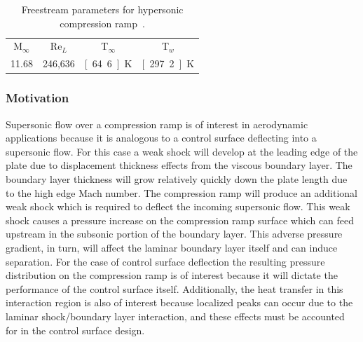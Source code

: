 \begin{table}[hbtp]
  \begin{center}
    \caption[Freestream parameters for hypersonic compression ramp.]{Freestream parameters for hypersonic compression ramp~\cite{holden_laminar_interaction,hypersonic_benchmarks}.\label{table:compression-ramp-freestream-parameters}}
    \vspace{1em}
    \begin{tabular}{cccc} \hline \hline
      M$_\infty$ & Re$_L$  & T$_\infty$ & T$_w$     \\
      11.68      & 246,636 & \unit[64.6]{K}   & \unit[297.2]{K} \\ \hline
    \end{tabular}
  \end{center}
\end{table}

\subsubsection{Motivation}
Supersonic flow over a compression ramp is of interest in aerodynamic applications because it is analogous to a control surface deflecting into a supersonic flow.  For this case a weak shock will develop at the leading edge of the plate due to displacement thickness effects from the viscous boundary layer.   The boundary layer thickness will grow relatively quickly down the plate length due to the high edge Mach number.  The compression ramp will produce an additional weak shock which is required to deflect the incoming supersonic flow.  This weak shock causes a pressure increase on the compression ramp surface which can feed upstream in the subsonic portion of the boundary layer.  This adverse pressure gradient, in turn, will affect the laminar boundary layer itself and can induce separation.  For the case of control surface deflection the resulting pressure distribution on the compression ramp is of interest because it will dictate the performance of the control surface itself.  Additionally, the heat transfer in this interaction region is also of interest because localized peaks can occur due to the laminar shock/boundary layer interaction, and these effects must be accounted for in the control surface design.


